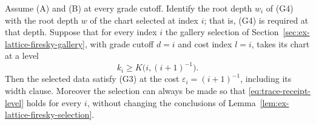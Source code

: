 \begin{proposition}
\label{prop:trace-rounded-receipt}
Assume (A) and (B) at every grade cutoff. Identify the root depth $w_i$
of (G4) with the root depth $w$ of the chart selected at index $i$; that
is, (G4) is required at that depth. Suppose that for every index $i$ the
gallery selection of Section~\ref{sec:ex-lattice-firesky-gallery}, with
grade cutoff $d=i$ and cost index $l=i$, takes its chart at a level
\begin{equation}\label{eq:trace-receipt-level}
 k_i\ge K\bigl(i,(i+1)^{-1}\bigr).
\end{equation}
Then the selected data satisfy (G3) at the cost
$\varepsilon_i=(i+1)^{-1}$, including its width clause. Moreover
the selection can always be made so that \eqref{eq:trace-receipt-level}
holds for every $i$, without changing the conclusions of
Lemma~\ref{lem:ex-lattice-firesky-selection}.
\end{proposition}

